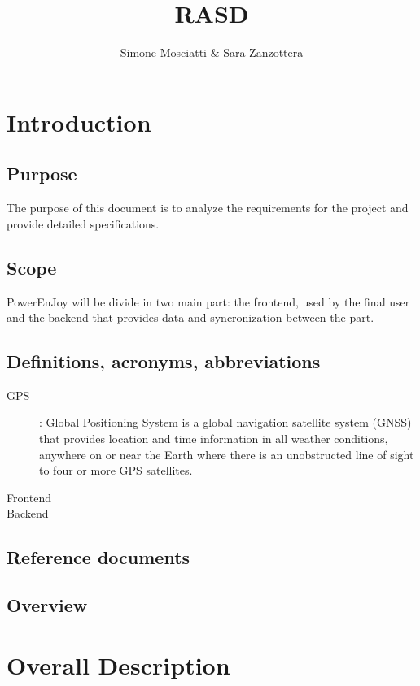 \documentclass[11pt]{article} %
\title{RASD}
\author{Simone Mosciatti \& Sara Zanzottera}
\newcommand{\pe}{PowerEnJoy }
\begin{document}
\maketitle


\section{Introduction}

  \subsection{Purpose}
  
The purpose of this document is to analyze the requirements for the project and provide detailed specifications.
  
  \subsection{Scope}
  
  \pe will be divide in two main part: the frontend, used by the final user and the backend that provides data and syncronization between the part.
  
  \subsection{Definitions,  acronyms,  abbreviations}
  	
  \begin{description}
  	\item[GPS]: Global Positioning System is a global navigation satellite system (GNSS) that provides location and time information in all weather conditions, anywhere on or near the Earth where there is an unobstructed line of sight to four or more GPS satellites.
  	\item[Frontend]
  	\item[Backend]
  \end{description}
  
  \subsection{Reference  documents}
  \subsection{Overview}
  
\section{Overall Description}
\end{document}
